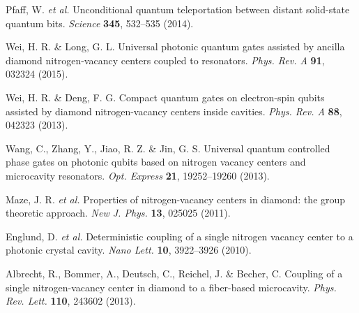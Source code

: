 \documentclass[showpacs,preprintnumbers,showkeys,amsmath,amssymb]{revtex4}%
\begin{document}
\begin{thebibliography}{61}


Pfaff, W. \emph{et al.} Unconditional quantum teleportation between distant solid-state quantum bits. \emph{Science} \textbf{345}, 532--535  (2014).



 Wei, H. R. \& Long, G. L. Universal photonic quantum gates assisted by ancilla diamond nitrogen-vacancy centers coupled to resonators. \emph{Phys. Rev. A} \textbf{91}, 032324 (2015).

 Wei, H. R. \& Deng, F. G. Compact quantum gates on electron-spin qubits assisted by diamond nitrogen-vacancy centers inside cavities. \emph{Phys. Rev. A} \textbf{88}, 042323 (2013).

 Wang, C., Zhang, Y., Jiao, R. Z. \& Jin, G. S. Universal quantum controlled phase gates on photonic qubits based on nitrogen vacancy centers and microcavity resonators. \emph{Opt. Express} \textbf{21}, 19252--19260 (2013).




 Maze, J. R. \emph{et al.} Properties of nitrogen-vacancy centers in diamond: the group theoretic approach. \emph{New J. Phys.} \textbf{13}, 025025 (2011).

Englund, D. \emph{et al.} Deterministic coupling of a single nitrogen vacancy center to a photonic crystal cavity. \emph{Nano Lett.} \textbf{10}, 3922--3926 (2010).

 Albrecht, R., Bommer,  A.,  Deutsch, C.,  Reichel, J. \&  Becher, C. Coupling of a single nitrogen-vacancy center in diamond to a fiber-based microcavity. \emph{Phys. Rev. Lett.} \textbf{110}, 243602 (2013).


\end{thebibliography}
\end{document}
